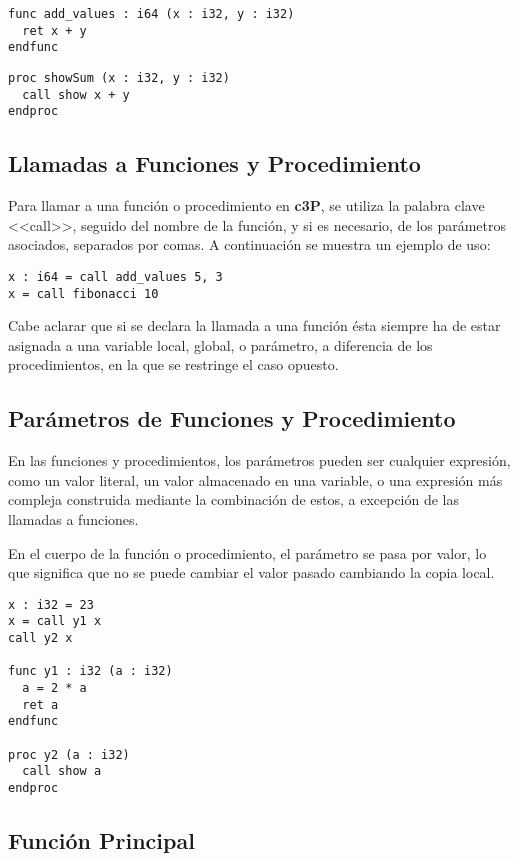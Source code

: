 \begin{verbatim}
func add_values : i64 (x : i32, y : i32)
  ret x + y
endfunc
\end{verbatim}

\begin{verbatim}
proc showSum (x : i32, y : i32)
  call show x + y
endproc
\end{verbatim}

\subsection{Llamadas a Funciones y Procedimiento}

Para llamar a una función o procedimiento en \textbf{c3P}, se utiliza la palabra clave <<call>>,
seguido del nombre de la función, y si es necesario, de los parámetros asociados, separados
por comas. A continuación se muestra un ejemplo de uso:

\begin{verbatim}
x : i64 = call add_values 5, 3
x = call fibonacci 10
\end{verbatim}

Cabe aclarar que si se declara la llamada a una función ésta siempre ha de estar asignada a una
variable local, global, o parámetro, a diferencia de los procedimientos, en la que se restringe
el caso opuesto.

\subsection{Parámetros de Funciones y Procedimiento}

En las funciones y procedimientos, los parámetros pueden ser cualquier expresión, como
un valor literal, un valor almacenado en una variable, o una expresión más compleja
construida mediante la combinación de estos, a excepción de las llamadas a funciones.

En el cuerpo de la función o procedimiento, el parámetro se pasa por valor, lo que
significa que no se puede cambiar el valor pasado cambiando la copia local.

\begin{verbatim}
x : i32 = 23
x = call y1 x
call y2 x

func y1 : i32 (a : i32)
  a = 2 * a
  ret a
endfunc

proc y2 (a : i32)
  call show a
endproc
\end{verbatim}

\subsection{Función Principal}

